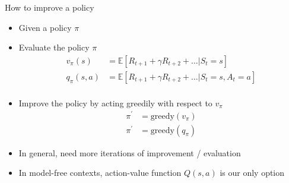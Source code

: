 \bgroup
\begin{frame}{How to improve a policy}
\begin{itemize}
\item Given a policy $\pi$
\item Evaluate the policy $\pi$
\begin{align*}
v_{\pi}(s) &= \mathbb{E}[R_{t+1} + \gamma R_{t+2} + \ldots|S_t = s]\\
q_{\pi}(s, a) &= \mathbb{E}[R_{t+1} + \gamma R_{t+2} + \ldots|S_t = s, A_t = a]\\
\end{align*}
\item Improve the policy by acting greedily with respect to $v_{\pi}$
\begin{align*}
\pi^{\prime} &=\text{greedy}(v_{\pi})\\
\pi^{\prime} &=\text{greedy}(q_{\pi})
\end{align*}
\item In general, need more iterations of improvement / evaluation
\item In model-free contexts, action-value function $Q(s, a)$ is our only option
\end{itemize}
\end{frame}
\egroup